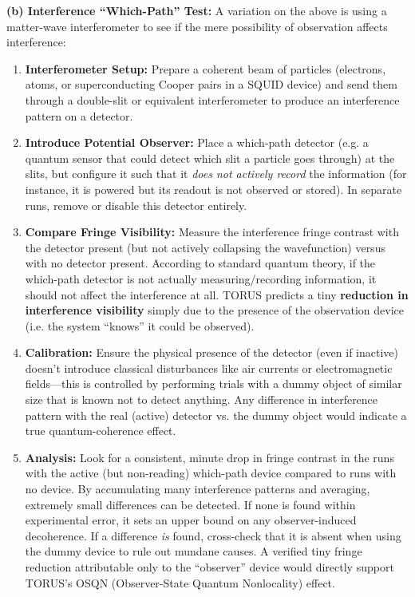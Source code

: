 \documentclass[
]{article}
\begin{document}
{\textbf{(b) Interference ``Which-Path'' Test:} A variation on the above
is using a matter-wave interferometer to see if the mere possibility of
observation affects interference:

\begin{enumerate}
\def\labelenumi{\arabic{enumi}.}
\setcounter{enumi}{5}
\item
  \textbf{Interferometer Setup:} Prepare a coherent beam of particles
  (electrons, atoms, or superconducting Cooper pairs in a SQUID device)
  and send them through a double-slit or equivalent interferometer to
  produce an interference pattern on a detector.
\item
  \textbf{Introduce Potential Observer:} Place a which-path detector
  (e.g. a quantum sensor that could detect which slit a particle goes
  through) at the slits, but configure it such that it \emph{does not
  actively record} the information (for instance, it is powered but its
  readout is not observed or stored). In separate runs, remove or
  disable this detector entirely.
\item
  \textbf{Compare Fringe Visibility:} Measure the interference fringe
  contrast with the detector present (but not actively collapsing the
  wavefunction) versus with no detector present. According to standard
  quantum theory, if the which-path detector is not actually
  measuring/recording information, it should not affect the interference
  at all. TORUS predicts a tiny \textbf{reduction in interference
  visibility} simply due to the presence of the observation device (i.e.
  the system ``knows'' it could be observed)\hspace{0pt}.
\item
  \textbf{Calibration:} Ensure the physical presence of the detector
  (even if inactive) doesn't introduce classical disturbances like air
  currents or electromagnetic fields---this is controlled by performing
  trials with a dummy object of similar size that is known not to detect
  anything. Any difference in interference pattern with the real
  (active) detector vs. the dummy object would indicate a true
  quantum-coherence effect.
\item
  \textbf{Analysis:} Look for a consistent, minute drop in fringe
  contrast in the runs with the active (but non-reading) which-path
  device compared to runs with no device. By accumulating many
  interference patterns and averaging, extremely small differences can
  be detected. If none is found within experimental error, it sets an
  upper bound on any observer-induced decoherence. If a difference
  \emph{is} found, cross-check that it is absent when using the dummy
  device to rule out mundane causes. A verified tiny fringe reduction
  attributable only to the ``observer'' device would directly support
  TORUS's OSQN (Observer-State Quantum Nonlocality) effect.
\end{enumerate}

}
\end{document}
